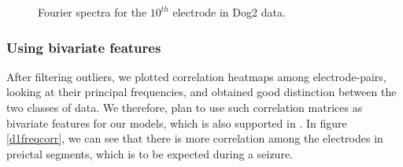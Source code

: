 \documentclass[a4paper]{article}
\begin{document}
\begin{figure}[H]
	\centering
	\qquad
	\caption{Fourier spectra for the $10^{th}$ electrode in Dog2 data.}
	\label{d2e10spec}
\end{figure}

\subsubsection{Using bivariate features}
After filtering outliers, we plotted correlation heatmaps among electrode-pairs, looking at their principal frequencies, and obtained good distinction between the two classes of data. We therefore, plan to use such correlation matrices as bivariate features for our models, which is also supported in \cite{lecun}. In figure \ref{d1freqcorr}, we can see that there is more correlation among the electrodes in preictal segments, which is to be expected during a seizure.
\end{document}
